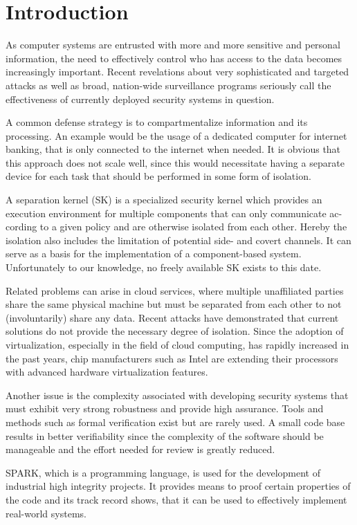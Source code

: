 \chapter{Introduction}
As computer systems are entrusted with more and more sensitive and personal
information, the need to effectively control who has access to the data becomes
increasingly important. Recent revelations about very sophisticated and targeted
attacks as well as broad, nation-wide surveillance programs seriously call the
effectiveness of currently deployed security systems in question.

A common defense strategy is to compartmentalize information and its processing.
An example would be the usage of a dedicated computer for internet banking, that
is only connected to the internet when needed. It is obvious that this approach
does not scale well, since this would necessitate having a separate device for
each task that should be performed in some form of isolation.

A separation kernel (SK) is a specialized security kernel which provides an
execution environment for multiple components that can only communicate ac-
cording to a given policy and are otherwise isolated from each other. Hereby
the isolation also includes the limitation of potential side- and covert channels.
It can serve as a basis for the implementation of a component-based system.
Unfortunately to our knowledge, no freely available SK exists to this date.

Related problems can arise in cloud services, where multiple unaffiliated parties
share the same physical machine but must be separated from each other to not
(involuntarily) share any data. Recent attacks
\cite{Wu:2012:WHH:2362793.2362802} have demonstrated that current solutions do
not provide the necessary degree of isolation. Since the adoption of
virtualization, especially in the field of cloud computing, has rapidly
increased in the past years, chip manufacturers such as Intel are extending
their processors with advanced hardware virtualization features.

Another issue is the complexity associated with developing security systems that
must exhibit very strong robustness and provide high assurance. Tools and
methods such as formal verification exist but are rarely used. A small code base
results in better verifiability since the complexity of the software should be
manageable and the effort needed for review is greatly reduced.

SPARK, which is a programming language, is used for the development of industrial
high integrity projects. It provides means to proof certain properties of the
code and its track record \cite{Chapman:2000:IES:369264.369270} shows, that it
can be used to effectively implement real-world systems.


